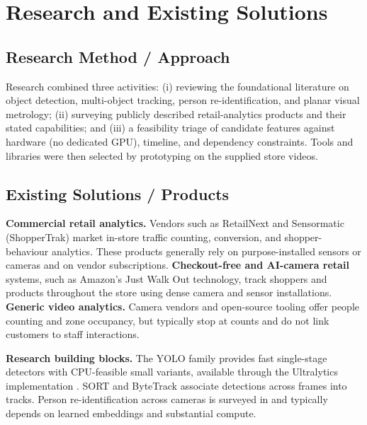\chapter{Research and Existing Solutions}
\label{ch:research}
\section{Research Method / Approach}
Research combined three activities: (i) reviewing the foundational literature on object detection, multi-object tracking, person re-identification, and planar visual metrology; (ii) surveying publicly described retail-analytics products and their stated capabilities; and (iii) a feasibility triage of candidate features against hardware (no dedicated GPU), timeline, and dependency constraints. Tools and libraries were then selected by prototyping on the supplied store videos.

\section{Existing Solutions / Products}
\textbf{Commercial retail analytics.} Vendors such as RetailNext and Sensormatic (ShopperTrak) market in-store traffic counting, conversion, and shopper-behaviour analytics. These products generally rely on purpose-installed sensors or cameras and on vendor subscriptions. \textbf{Checkout-free and AI-camera retail} systems, such as Amazon's Just Walk Out technology, track shoppers and products throughout the store using dense camera and sensor installations. \textbf{Generic video analytics.} Camera vendors and open-source tooling offer people counting and zone occupancy, but typically stop at counts and do not link customers to staff interactions.

\textbf{Research building blocks.} The YOLO family \cite{redmon2016yolo} provides fast single-stage detectors with CPU-feasible small variants, available through the Ultralytics implementation \cite{ultralytics}. SORT \cite{bewley2016sort} and ByteTrack \cite{zhang2022bytetrack} associate detections across frames into tracks. Person re-identification across cameras is surveyed in \cite{ye2022reid} and typically depends on learned embeddings and substantial compute.

